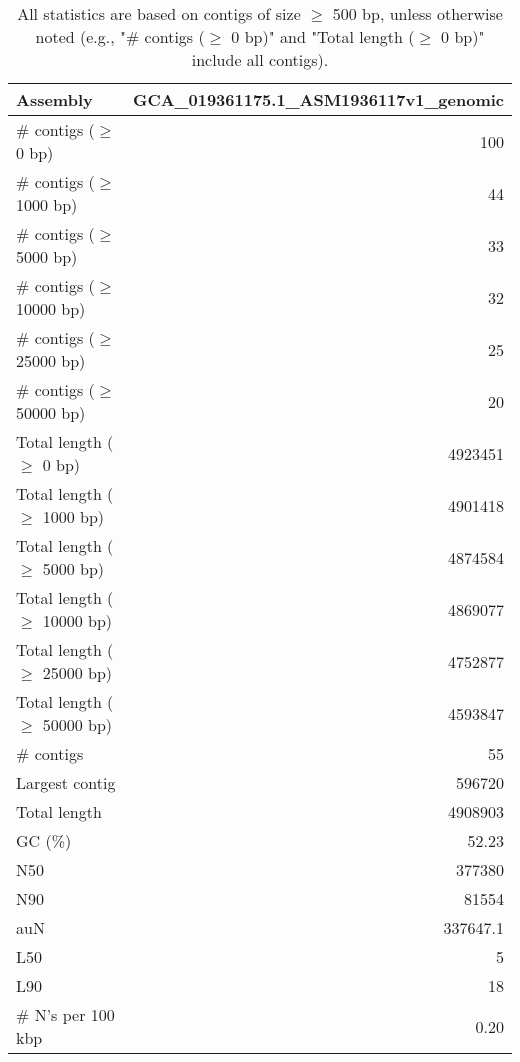 \documentclass[12pt,a4paper]{article}
\begin{document}
\begin{table}[ht]
\begin{center}
\caption{All statistics are based on contigs of size $\geq$ 500 bp, unless otherwise noted (e.g., "\# contigs ($\geq$ 0 bp)" and "Total length ($\geq$ 0 bp)" include all contigs).}
\begin{tabular}{|l*{1}{|r}|}
\hline
Assembly & GCA\_019361175.1\_ASM1936117v1\_genomic \\ \hline
\# contigs ($\geq$ 0 bp) & 100 \\ \hline
\# contigs ($\geq$ 1000 bp) & 44 \\ \hline
\# contigs ($\geq$ 5000 bp) & 33 \\ \hline
\# contigs ($\geq$ 10000 bp) & 32 \\ \hline
\# contigs ($\geq$ 25000 bp) & 25 \\ \hline
\# contigs ($\geq$ 50000 bp) & 20 \\ \hline
Total length ($\geq$ 0 bp) & 4923451 \\ \hline
Total length ($\geq$ 1000 bp) & 4901418 \\ \hline
Total length ($\geq$ 5000 bp) & 4874584 \\ \hline
Total length ($\geq$ 10000 bp) & 4869077 \\ \hline
Total length ($\geq$ 25000 bp) & 4752877 \\ \hline
Total length ($\geq$ 50000 bp) & 4593847 \\ \hline
\# contigs & 55 \\ \hline
Largest contig & 596720 \\ \hline
Total length & 4908903 \\ \hline
GC (\%) & 52.23 \\ \hline
N50 & 377380 \\ \hline
N90 & 81554 \\ \hline
auN & 337647.1 \\ \hline
L50 & 5 \\ \hline
L90 & 18 \\ \hline
\# N's per 100 kbp & 0.20 \\ \hline
\end{tabular}
\end{center}
\end{table}
\end{document}
